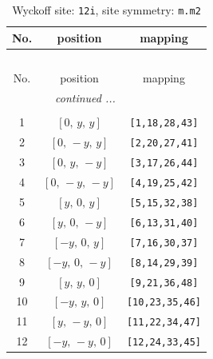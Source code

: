 \documentclass[fleqn,8pt]{jsarticle}
\begin{document}
\begin{longtable}{ccc}
\caption{Wyckoff site: {\tt 12i}, site symmetry: {\tt m.m2}}
 \\
 \hline \hline
No. & position & mapping \\ \hline \endfirsthead

\multicolumn{2}{l}{\tablename\ \thetable{}} \\
 \hline \hline
No. & position & mapping \\ \hline \endhead

 \hline \hline
\multicolumn{2}{r}{\footnotesize\it continued ...} \\ \endfoot

 \hline \hline
\multicolumn{2}{r}{} \\ \endlastfoot

1 & $\left[ 0,\, y,\, y \right]$ & {\tt [1,18,28,43]} \\ \hline
2 & $\left[ 0,\, - y,\, y \right]$ & {\tt [2,20,27,41]} \\ \hline
3 & $\left[ 0,\, y,\, - y \right]$ & {\tt [3,17,26,44]} \\ \hline
4 & $\left[ 0,\, - y,\, - y \right]$ & {\tt [4,19,25,42]} \\ \hline
5 & $\left[ y,\, 0,\, y \right]$ & {\tt [5,15,32,38]} \\ \hline
6 & $\left[ y,\, 0,\, - y \right]$ & {\tt [6,13,31,40]} \\ \hline
7 & $\left[ - y,\, 0,\, y \right]$ & {\tt [7,16,30,37]} \\ \hline
8 & $\left[ - y,\, 0,\, - y \right]$ & {\tt [8,14,29,39]} \\ \hline
9 & $\left[ y,\, y,\, 0 \right]$ & {\tt [9,21,36,48]} \\ \hline
10 & $\left[ - y,\, y,\, 0 \right]$ & {\tt [10,23,35,46]} \\ \hline
11 & $\left[ y,\, - y,\, 0 \right]$ & {\tt [11,22,34,47]} \\ \hline
12 & $\left[ - y,\, - y,\, 0 \right]$ & {\tt [12,24,33,45]} \\
\end{longtable}
\renewcommand{\arraystretch}{1.2}
\end{document}
